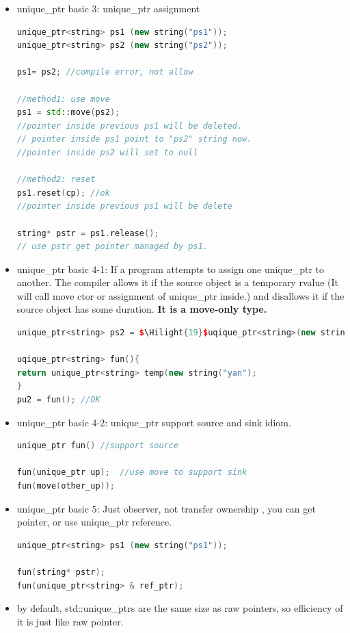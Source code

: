\documentclass[a4paper,12pt,twoside]{book}
\newcommand{\Hilight}[1]{\makebox[0pt][l]{\color{yellow}\rule[-3pt]{#1em}{11pt}}}
\begin{document}
\begin{itemize}
\item unique\_ptr basic 3: unique\_ptr assignment
\begin{lstlisting}[frame=single, language=c++]
unique_ptr<string> ps1 (new string("ps1"));
unique_ptr<string> ps2 (new string("ps2"));

ps1= ps2; //compile error, not allow

//method1: use move
ps1 = std::move(ps2);
//pointer inside previous ps1 will be deleted.
// pointer inside ps1 point to "ps2" string now.
//pointer inside ps2 will set to null

//method2: reset
ps1.reset(cp); //ok
//pointer inside previous ps1 will be delete

string* pstr = ps1.release();
// use pstr get pointer managed by ps1.
\end{lstlisting}

\item unique\_ptr basic 4-1: If a program attempts to assign one unique\_ptr to another. The compiler allows it if the source object is a temporary rvalue (It will call move ctor or assignment of unique\_ptr inside.) and disallows it if the source object has some duration. \textbf{It is a move-only type.}
\begin{lstlisting}[frame=single, language=c++, mathescape=true]
unique_ptr<string> ps2 = $\Hilight{19}$uqique_ptr<string>(new string("yo") ); //OK

uqique_ptr<string> fun(){
return unique_ptr<string> temp(new string("yan");
}
pu2 = fun(); //OK
\end{lstlisting}

\item unique\_ptr basic 4-2: unique\_ptr support source and sink idiom.
\begin{lstlisting}[frame=single, language=c++]
unique_ptr fun() //support source

fun(unique_ptr up);  //use move to support sink
fun(move(other_up));
\end{lstlisting}

\item unique\_ptr basic 5: Just observer, not transfer ownership , you can get pointer, or use unique\_ptr reference.
\begin{lstlisting}[frame=single, language=c++]
unique_ptr<string> ps1 (new string("ps1"));

fun(string* pstr);
fun(unique_ptr<string> & ref_ptr);
\end{lstlisting}

\item by default, std::unique\_ptrs are the same size as raw pointers, so efficiency of it is just like raw pointer.


\end{itemize}
\end{document}
